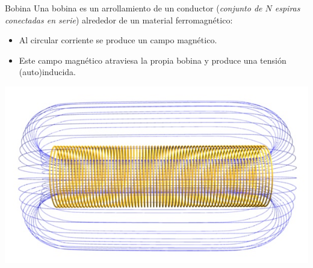 \documentclass[xcolor={usenames,svgnames,dvipsnames}]{beamer}
\begin{document}
\begin{frame}[label={sec:orgb792fc2}]{Bobina}
Una bobina es un arrollamiento de un conductor (\emph{conjunto de \(N\) espiras conectadas en serie}) alrededor de un material ferromagnético:
\begin{itemize}
\item Al circular corriente se produce un campo magnético.
\item Este campo magnético atraviesa la propia bobina y produce una tensión (auto)inducida.
\end{itemize}
\begin{center}
\includegraphics[height=0.5\textheight]{../figs/Solenoide.jpg}
\end{center}
\end{frame}
\end{document}
